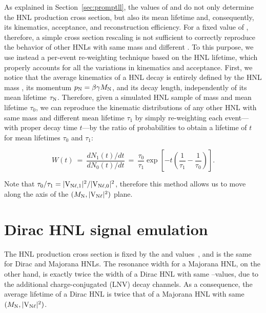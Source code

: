 As explained in Section~\ref{sec:promptll}, the values of \mhnl
and \mixpar do not only determine the HNL production cross section,
but also its mean lifetime and, consequently, its kinematics,
acceptance, and reconstruction efficiency.
For a fixed value of \mhnl, therefore, a simple cross section
rescaling is not sufficient to correctly reproduce the behavior of
other HNLs with same mass and different \mixpar.
To this purpose, we use instead a per-event re-weighting technique
based on the HNL lifetime, which properly accounts for all the
variations in kinematics and acceptance.
First, we notice that the average kinematics of a HNL decay
is entirely defined by the HNL mass \mhnl, its momentum
$p_\mathrm{N}=\beta\gamma M_{\mathrm{N}}$, and its decay length,
independently of its mean lifetime $\tau_\mathrm{N}$.
Therefore, given a simulated HNL sample of mass \mhnl and mean
lifetime $\tau_0$, we can reproduce the kinematic distributions of any
other HNL with same mass and different mean lifetime $\tau_1$ by
simply re-weighting each event---with proper decay time
$t$---by the ratio of probabilities to obtain a lifetime of $t$ for
mean lifetimes $\tau_0$ and $\tau_1$: 
\begin{linenomath}
  \begin{equation}
    W(t) ~=~ \frac{dN_1(t)/dt}{dN_0(t)/dt} ~=~
    \frac{\tau_0}{\tau_1}\exp{\left[-t\left(\frac{1}{\tau_1}-\frac{1}{\tau_0}\right)\right]}.
  \end{equation}
  \label{eq:ctauReweighting}
\end{linenomath}
Note that
$\tau_0/\tau_1 = |\mathrm{V_{\mathrm{N}\ell,1}}|^2/|\mathrm{V_{\mathrm{N}\ell,0}}|^2$,
therefore this method allows us to move along the \mixpar axis of the
$(M_{\mathrm{N}},\mathrm{|V_{\mathrm{N}\ell}|^2})$ plane.


\section{Dirac HNL signal emulation}
\label{sec:signalDirac}
The HNL production cross section is fixed by the \mhnl and \mixpar
values~\cite{Degrande:2016aje,heavyN}, and is the same for Dirac and
Majorana HNLs.
The resonance width for a Majorana HNL, on the other hand, is exactly
twice the width of a Dirac HNL with same \mhnl--\mixpar values, due to
the additional charge-conjugated (LNV) decay channels.
As a consequence, the average lifetime of a Dirac HNL is twice that of
a Majorana HNL with same $(M_{\mathrm{N}},\mathrm{|V_{\mathrm{N}\ell}|^2})$.

